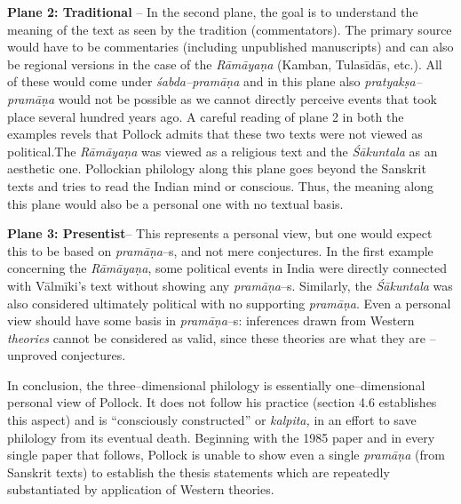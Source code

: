 \textbf{Plane 2: Traditional} – In the second plane, the goal is to understand the meaning of the text as seen by the tradition (commentators). The primary source would have to be commentaries (including unpublished manuscripts) and can also be regional versions in the case of the \textit{Rāmāyaṇa} (Kamban, Tulasīdās, etc.). All of these would come under \textit{śabda–pramāṇa} and in this plane also \textit{pratyakṣa–pramāṇa} would not be possible as we cannot directly perceive events that took place several hundred years ago. A careful reading of plane 2 in both the examples revels that Pollock admits that these two texts were not viewed as political.The \textit{Rāmāyaṇa }was viewed as a religious text and the \textit{Śākuntala} as an aesthetic one. Pollockian philology along this plane goes beyond the Sanskrit texts and tries to read the Indian mind or conscious. Thus, the meaning along this plane would also be a personal one with no textual basis.

\textbf{Plane 3: Presentist}– This represents a personal view, but one would expect this to be based on \textit{pramāṇa}–s, and not mere conjectures. In the first example concerning the \textit{Rāmāyaṇa}, some political events in India were directly connected with Vālmīki’s text without showing any \textit{pramāṇa}–s. Similarly, the \textit{Śākuntala }was also considered ultimately political with no supporting \textit{pramāṇa}. Even a personal view should have some basis in \textit{pramāṇa}–s: inferences drawn from Western \textit{theories} cannot be considered as valid, since these theories are what they are – unproved conjectures.

In conclusion, the three–dimensional philology is essentially one–dimensional personal view of Pollock. It does not follow his practice (section 4.6 establishes this aspect) and is “consciously constructed” or \textit{kalpita,} in an effort to save philology from its eventual death. Beginning with the 1985 paper and in every single paper that follows, Pollock is unable to show even a single \textit{pramāṇa }(from Sanskrit texts) to establish the thesis statements which are repeatedly substantiated by application of Western theories.

